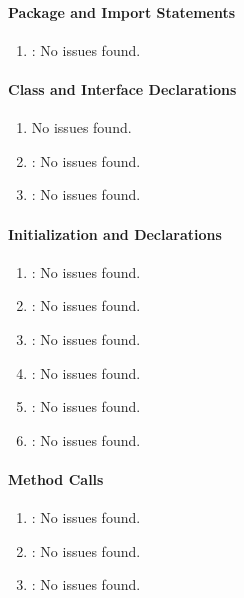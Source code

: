 \paragraph{Package and Import Statements} %
\label{par:package_and_import_statements}

\begin{enumerate} [resume]
	\item \emph{\checkX}: No issues found.
\end{enumerate}

\paragraph{Class and Interface Declarations} %
\label{par:class_and_interface_declarations}

\begin{enumerate} [resume]
	\item \emph{\checkY}No issues found.
	\item \emph{\checkZ}: No issues found.
	\item \emph{\checkAA}: No issues found.
\end{enumerate}

\paragraph{Initialization and Declarations} %
\label{par:initialization_and_declarations}

\begin{enumerate} [resume]
	\item \emph{\checkAB}: No issues found.
	\item \emph{\checkAC}: No issues found.
	\item \emph{\checkAD}: No issues found.
	\item \emph{\checkAE}: No issues found.
	\item \emph{\checkAF}: No issues found.
	\item \emph{\checkAG}: No issues found.
\end{enumerate}

\paragraph{Method Calls} %
\label{par:method_calls}

\begin{enumerate} [resume]
	\item \emph{\checkAH}: No issues found.
	\item \emph{\checkAI}: No issues found.
	\item \emph{\checkAJ}: No issues found.
\end{enumerate} 

